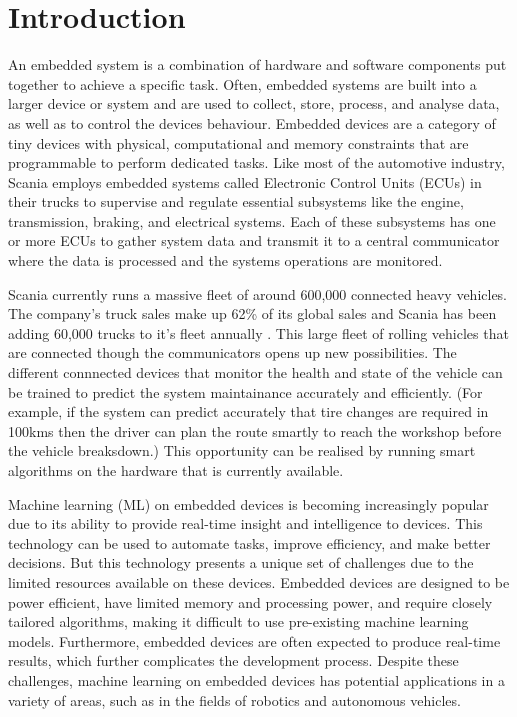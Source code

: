 \part{Introduction}

An embedded system is a combination of hardware and software components put together to achieve a specific task. Often, embedded systems are built into a larger device or system and are used to collect, store, process, and analyse data, as well as to control the device\textquotesingle s behaviour. Embedded devices are a category of tiny devices with physical, computational and memory constraints that are programmable to perform dedicated tasks.
Like most of the automotive industry, Scania employs embedded systems called Electronic Control Units (ECUs) in their trucks to supervise and regulate essential subsystems like the engine, transmission, braking, and electrical systems. Each of these subsystems has one or more ECUs to gather system data and transmit it to a central communicator where the data is processed and the systems operations are monitored.

Scania currently runs a massive fleet of around 600,000 connected heavy vehicles. The company's truck sales make up 62\% of its global sales and Scania has been adding 60,000 trucks to it's fleet annually \cite{scania-report}. This large fleet of rolling vehicles that are connected though the communicators opens up new possibilities. The different connnected devices that monitor the health and state of the vehicle can be trained to predict the system maintainance accurately and efficiently. (For example, if the system can predict accurately that tire changes are required in 100kms then the driver can plan the route smartly to reach the workshop before the vehicle breaksdown.) This opportunity can be realised by running smart algorithms on the hardware that is currently available.

Machine learning (ML) on embedded devices is becoming increasingly popular due to its ability to provide real-time insight and intelligence to devices. This technology can be used to automate tasks, improve efficiency, and make better decisions. But this technology presents a unique set of challenges due to the limited resources available on these devices. Embedded devices are designed to be power efficient, have limited memory and processing power, and require closely tailored algorithms, making it difficult to use pre-existing machine learning models. Furthermore, embedded devices are often expected to produce real-time results, which further complicates the development process. Despite these challenges, machine learning on embedded devices has potential applications in a variety of areas, such as in the fields of robotics and autonomous vehicles.

